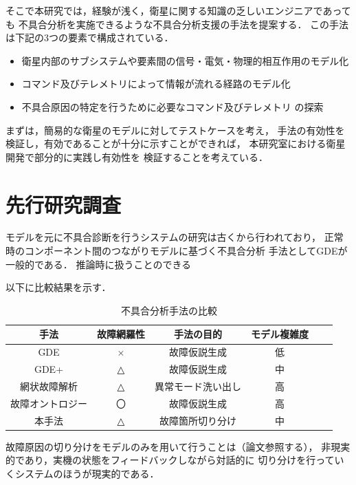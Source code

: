 \documentclass[11pt]{article}
\begin{document}
そこで本研究では，経験が浅く，衛星に関する知識の乏しいエンジニアであっても
不具合分析を実施できるような不具合分析支援の手法を提案する．
この手法は下記の3つの要素で構成されている．
\begin{itemize}
   \item 衛星内部のサブシステムや要素間の信号・電気・物理的相互作用のモデル化
   \item コマンド及びテレメトリによって情報が流れる経路のモデル化
   \item 不具合原因の特定を行うために必要なコマンド及びテレメトリ
   の探索 %
\end{itemize}
   
まずは，簡易的な衛星のモデルに対してテストケースを考え，
手法の有効性を検証し，有効であることが十分に示すことができれば，
本研究室における衛星開発で部分的に実践し有効性を
検証することを考えている．\\

\section{先行研究調査}
モデルを元に不具合診断を行うシステムの研究は古くから行われており，\cite{}
正常時のコンポーネント間のつながりモデルに基づく不具合分析
手法としてGDEが一般的である．
推論時に扱うことのできる

以下に比較結果を示す．
\begin{table}[H]
   \centering
   \caption{不具合分析手法の比較}
      \begin{tabular}{cccccc} \hline%
         手法&故障網羅性&手法の目的&モデル複雑度%
         \\ \hline
         GDE&×&故障仮説生成&低\\
         GDE+\cite{Struss1989}&△&故障仮説生成&中\\
         網状故障解析\cite{Yamaguchi2014}&△&異常モード洗い出し&高\\
         故障オントロジー\cite{Kitamura1999}&〇&故障仮説生成&高\\
         本手法&△&故障箇所切り分け&中\\ \hline
      \end{tabular}
\end{table}

故障原因の切り分けをモデルのみを用いて行うことは（論文参照する），
非現実的であり，実機の状態をフィードバックしながら対話的に
切り分けを行っていくシステムのほうが現実的である．
\end{document}
